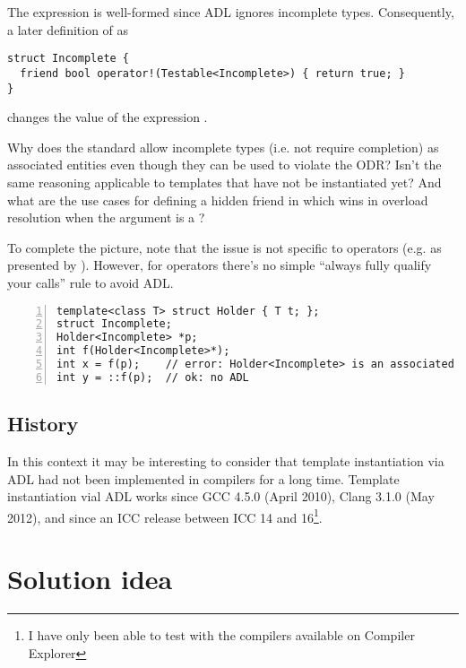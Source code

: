 
The expression  is well-formed since ADL ignores incomplete types. Consequently, 
a later definition of  as
\medskip\begin{lstlisting}[style=Vc]
struct Incomplete {
  friend bool operator!(Testable<Incomplete>) { return true; }
}
\end{lstlisting}
changes the value of the expression .

Why does the standard allow incomplete types (i.e. not require completion) as associated 
entities even though they can be used to violate the ODR? Isn't the same reasoning 
applicable to templates that have not be instantiated yet? And what are the use cases for 
defining a hidden friend in  which wins in overload resolution when 
the argument is a ?

To complete the picture, note that the issue is not specific to operators (e.g. 
 as presented by \textcite{P2538R0}). However, for operators there's no 
simple “always fully qualify your calls” rule to avoid ADL.

\begin{lstlisting}[style=Vc,numbers=left,float,label=lst:example2,caption={
Minimal example triggering ill-formed instantiation
}]
template<class T> struct Holder { T t; };
struct Incomplete;
Holder<Incomplete> *p;
int f(Holder<Incomplete>*);
int x = f(p);    // error: Holder<Incomplete> is an associated entity
int y = ::f(p);  // ok: no ADL
\end{lstlisting}

\subsection{History}

In this context it may be interesting to consider that template instantiation via ADL had 
not been implemented in compilers for a long time. Template instantiation vial ADL works 
since GCC 4.5.0 (April 2010), Clang 3.1.0 (May 2012), and since an ICC release between ICC 
14 and 16\footnote{I have only been able to test with the compilers available on Compiler 
   Explorer}.

\pagebreak

\section{Solution idea}

